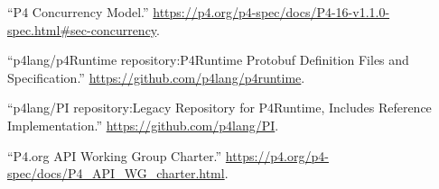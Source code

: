 \documentclass[11pt]{article}
\begin{document}
{{\begin{thebibliography}{36}
\mdbibitemlabel{{}[13]}\textquotedblleft{}P4 Concurrency Model.\textquotedblright{} \href{https://p4.org/p4-spec/docs/P4-16-v1.1.0-spec.html\%23sec-concurrency}{{\ttfamily https://\hspace{0pt}p4.\hspace{0pt}org/\hspace{0pt}p4-\hspace{0pt}spec/\hspace{0pt}docs/\hspace{0pt}P4-\hspace{0pt}16-\hspace{0pt}v1.\hspace{0pt}1.\hspace{0pt}0-\hspace{0pt}spec.\hspace{0pt}html\#\hspace{0pt}sec-\hspace{0pt}concurrency}}.\label{p4concurrency}%

\mdbibitemlabel{{}[14]}\textquotedblleft{}p4lang/p4Runtime repository:P4Runtime Protobuf Definition Files and Specification.\textquotedblright{} \href{https://github.com/p4lang/p4runtime}{{\ttfamily https://\hspace{0pt}github.\hspace{0pt}com/\hspace{0pt}p4lang/\hspace{0pt}p4runtime}}.\label{p4runtimerepo}%

\mdbibitemlabel{{}[15]}\textquotedblleft{}p4lang/PI repository:Legacy Repository for P4Runtime, Includes Reference Implementation.\textquotedblright{} \href{https://github.com/p4lang/PI}{{\ttfamily https://\hspace{0pt}github.\hspace{0pt}com/\hspace{0pt}p4lang/\hspace{0pt}PI}}.\label{pirepo}%

\mdbibitemlabel{{}[16]}\textquotedblleft{}P4.org API Working Group Charter.\textquotedblright{} \href{https://p4.org/p4-spec/docs/P4_API_WG_charter.html}{{\ttfamily https://\hspace{0pt}p4.\hspace{0pt}org/\hspace{0pt}p4-\hspace{0pt}spec/\hspace{0pt}docs/\hspace{0pt}P4\_\hspace{0pt}API\_\hspace{0pt}WG\_\hspace{0pt}charter.\hspace{0pt}html}}.\label{p4apiwgcharter}%


\end{thebibliography}}}
\end{document}
